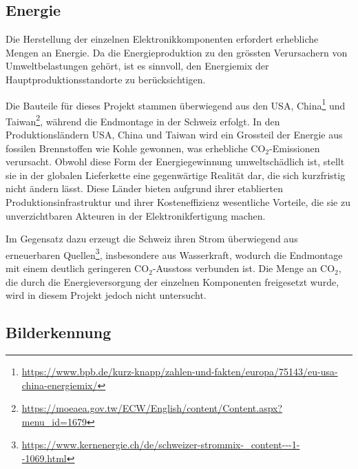 
\subsection{Energie}

Die Herstellung der einzelnen Elektronikkomponenten erfordert erhebliche Mengen an Energie. Da die Energieproduktion zu den grössten Verursachern von Umweltbelastungen gehört, ist es sinnvoll, den Energiemix der Hauptproduktionsstandorte zu berücksichtigen.

Die Bauteile für dieses Projekt stammen überwiegend aus den USA, China\footnote{\url{https://www.bpb.de/kurz-knapp/zahlen-und-fakten/europa/75143/eu-usa-china-energiemix/}} und Taiwan\footnote{\url{https://moeaea.gov.tw/ECW/English/content/Content.aspx?menu_id=1679}}, während die Endmontage in der Schweiz erfolgt. In den Produktionsländern USA, China und Taiwan wird ein Grossteil der Energie aus fossilen Brennstoffen wie Kohle gewonnen, was erhebliche CO$_{2}$-Emissionen verursacht. Obwohl diese Form der Energiegewinnung umweltschädlich ist, stellt sie in der globalen Lieferkette eine gegenwärtige Realität dar, die sich kurzfristig nicht ändern lässt. Diese Länder bieten aufgrund ihrer etablierten Produktionsinfrastruktur und ihrer Kosteneffizienz wesentliche Vorteile, die sie zu unverzichtbaren Akteuren in der Elektronikfertigung machen.

Im Gegensatz dazu erzeugt die Schweiz ihren Strom überwiegend aus erneuerbaren Quellen\footnote{\url{https://www.kernenergie.ch/de/schweizer-strommix-_content---1--1069.html}}, insbesondere aus Wasserkraft, wodurch die Endmontage mit einem deutlich geringeren CO$_{2}$-Ausstoss verbunden ist. Die Menge an CO$_{2}$, die durch die Energieversorgung der einzelnen Komponenten freigesetzt wurde, wird in diesem Projekt jedoch nicht untersucht.




\subsection{Bilderkennung}

